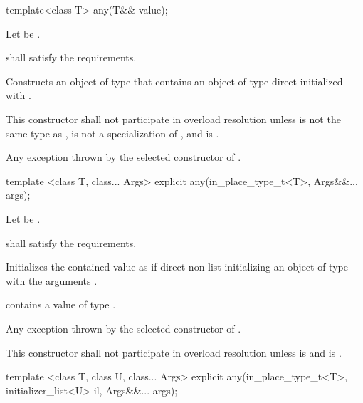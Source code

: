 %
\begin{itemdecl}
template<class T>
  any(T&& value);
\end{itemdecl}

\begin{itemdescr}
\pnum
Let  be .

\pnum
\requires
{} shall satisfy the  requirements.

\pnum
\effects
Constructs an object of type  that contains an object of type  direct-initialized with .

\pnum
\remarks
This constructor shall not participate in overload resolution unless
 is not the same type as ,
 is not a specialization of ,
and  is .

\pnum
\throws
Any exception thrown by the selected constructor of .
\end{itemdescr}

%
\begin{itemdecl}
template <class T, class... Args>
  explicit any(in_place_type_t<T>, Args&&... args);
\end{itemdecl}

\begin{itemdescr}
\pnum
Let  be .

\pnum
\requires {} shall satisfy the  requirements.

\pnum
\effects Initializes the contained value as if direct-non-list-initializing an object of
type  with the arguments .

\pnum
\postconditions {} contains a value of type .

\pnum
\throws Any exception thrown by the selected constructor of .

\pnum
\remarks
This constructor shall not participate in overload resolution unless
 is  and
 is .
\end{itemdescr}

%
\begin{itemdecl}
template <class T, class U, class... Args>
  explicit any(in_place_type_t<T>, initializer_list<U> il, Args&&... args);
\end{itemdecl}

